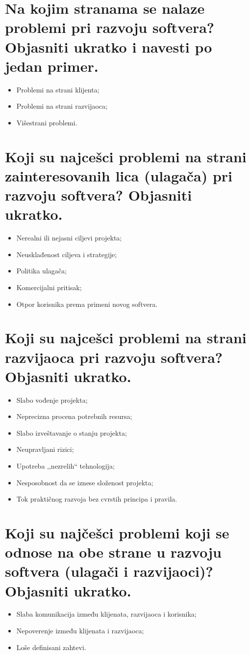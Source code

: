 \documentclass[a4paper]{article}
\begin{document}
\section{Na kojim stranama se nalaze problemi pri razvoju softvera? Objasniti ukratko i navesti 
         po jedan primer.}
    \begin{itemize}
      \item Problemi na strani klijenta;
      \item Problemi na strani razvijaoca;
      \item Višestrani problemi.
    \end{itemize}

\section{Koji su najcešci problemi na strani zainteresovanih lica (ulagača) pri razvoju softvera? 
         Objasniti ukratko.}
    \begin{itemize}
      \item Nerealni ili nejasni ciljevi projekta;
      \item Neusklađenost ciljeva i strategije;
      \item Politika ulagača;
      \item Komercijalni pritisak;
      \item Otpor korisnika prema primeni novog softvera.
    \end{itemize}

\section{Koji su najcešci problemi na strani razvijaoca pri razvoju softvera? Objasniti ukratko.}
    \begin{itemize}
      \item Slabo vođenje projekta;
      \item Neprecizna procena potrebnih resursa;
      \item Slabo izveštavanje o stanju projekta;
      \item Neupravljani rizici;
      \item Upotreba ,,nezrelih`` tehnologija;
      \item Nesposobnost da se iznese složenost projekta;
      \item Tok praktičnog razvoja bez cvrstih principa i pravila.
    \end{itemize}

\section{Koji su najčešci problemi koji se odnose na obe strane u razvoju softvera 
         (ulagači i razvijaoci)? Objasniti ukratko.}
    \begin{itemize}
      \item Slaba komunikacija između klijenata, razvijaoca i korisnika;
      \item Nepoverenje između klijenata i razvijaoca;
      \item Loše definisani zahtevi.
    \end{itemize}
\end{document}
